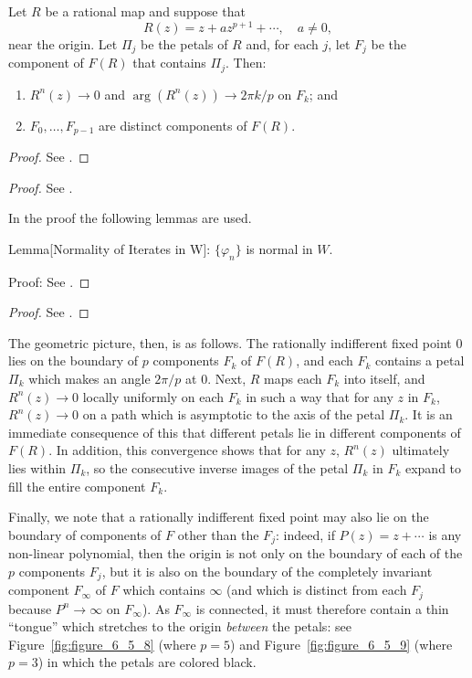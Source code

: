 \begin{theorem}
    \label{thm:relation_between_petals_and_fatou_set}
    Let $R$ be a rational map and suppose that
    \begin{equation*}
        R(z) = z + az^{p+1} + \cdots, \quad a \neq 0,
    \end{equation*}
    near the origin. Let $\Pi_j$ be the petals of $R$ and, for each $j$, let
    $F_j$ be the component of $F(R)$ that contains $\Pi_j$. Then:
    \begin{enumerate}[label=(\roman*)]
        \item $R^n(z) \to 0$ and $\arg(R^n(z)) \to 2\pi k/p$ on $F_k$; and
        \item $F_0, \dots, F_{p-1}$ are distinct components of $F(R)$.
    \end{enumerate}
\end{theorem}
\begin{proof}
    See \cite[126]{Beardon1991}.
\end{proof}
\begin{proof}
    See \cite[126--128]{Beardon1991}.

    In the proof the following lemmas are used.

    Lemma[Normality of Iterates in W]: $\{\varphi_n\}$ is normal in $W$.

    Proof: See \cite[127]{Beardon1991}.
\end{proof}
\begin{proof}
    See \cite[128--130]{Beardon1991}.
\end{proof}

The geometric picture, then, is as follows. The rationally indifferent fixed
point $0$ lies on the boundary of $p$ components $F_k$ of $F(R)$, and each $F_k$
contains a petal $\Pi_k$ which makes an angle $2\pi/p$ at $0$. Next, $R$ maps
each $F_k$ into itself, and $R^n(z) \to 0$ locally uniformly on each $F_k$ in
such a way that for any $z$ in $F_k$, $R^n(z) \to 0$ on a path which is
asymptotic to the axis of the petal $\Pi_k$. It is an immediate consequence of
this that different petals lie in different components of $F(R)$. In addition,
this convergence shows that for any $z$, $R^n(z)$ ultimately lies within
$\Pi_k$, so the consecutive inverse images of the petal $\Pi_k$ in $F_k$ expand
to fill the entire component $F_k$.

Finally, we note that a rationally indifferent fixed point may also lie on the
boundary of components of $F$ other than the $F_j$: indeed, if $P(z) = z +
\cdots$ is any non-linear polynomial, then the origin is not only on the
boundary of each of the $p$ components $F_j$, but it is also on the boundary of
the completely invariant component $F_\infty$ of $F$ which contains $\infty$
(and which is distinct from each $F_j$ because $P^n \to \infty$ on $F_\infty$).
As $F_\infty$ is connected, it must therefore contain a thin \enquote{tongue}
which stretches to the origin \emph{between} the petals: see
Figure~\ref{fig:figure_6_5_8} (where $p = 5$) and Figure~\ref{fig:figure_6_5_9}
(where $p = 3$) in which the petals are colored black.

